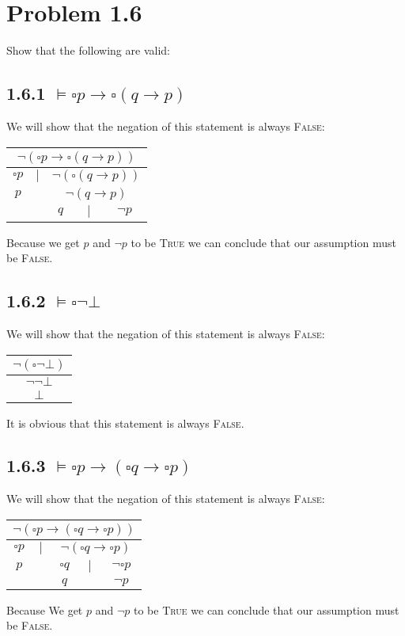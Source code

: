 \documentclass{report}
\begin{document}
	\section*{Problem 1.6}
	Show that the following are valid:
	\subsection*{1.6.1 $\models \square p \rightarrow \square(q \rightarrow p)$}
	We will show that the negation of this statement is always \textsc{False}:
	\begin{center}
		\begin{tabular}{ccccc}
			\multicolumn{5}{c}{$\neg (\square p \rightarrow \square (q \rightarrow p))$} \\ \hline
			$\square p$ & $\mid$ & \multicolumn{3}{c}{$\neg (\square (q \rightarrow p))$} \\ \cline{1-1} \cline{3-5}
			$p$ & & \multicolumn{3}{c}{$\neg (q \rightarrow p)$} \\ \cline{3-5}
			& & $q$ & $\mid$ & $\neg p$
		\end{tabular}
	\end{center}
	Because we get $p$ and $\neg p$ to be \textsc{True} we can conclude that our assumption must be \textsc{False}.
	\subsection*{1.6.2 $\models \square \neg \bot$}
	We will show that the negation of this statement is always \textsc{False}:
	\begin{center}
		\begin{tabular}{c}
			$\neg (\square \neg \bot)$ \\ \hline
			$\neg \neg \bot $ \\ \hline
			$\bot $
		\end{tabular}
	\end{center}
	It is obvious that this statement is always \textsc{False}.
	\subsection*{1.6.3 $\models \square p \rightarrow(\square q \rightarrow \square p)$}
	We will show that the negation of this statement is always \textsc{False}:
	\begin{center}
		\begin{tabular}{ccccc}
			\multicolumn{5}{c}{$\neg (\square p \rightarrow (\square q \rightarrow \square p))$} \\ \hline
			$\square p$ & $\mid$ & \multicolumn{3}{c}{$\neg (\square q \rightarrow \square p)$} \\ \cline{1-1} \cline{3-5}
			$p$ & & $\square q$ & $\mid$ & $\neg \square p$ \\ \cline{3-3} \cline{5-5}
			& & $q$ & & $\neg p$
		\end{tabular}
	\end{center}
	Because We get $p$ and $\neg p$ to be \textsc{True} we can conclude that our assumption must be \textsc{False}.
\end{document}

